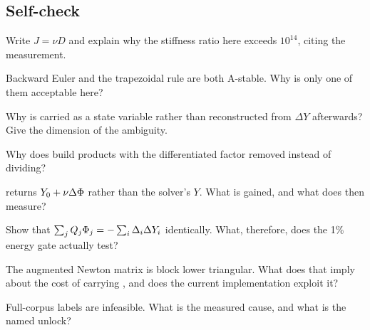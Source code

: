 \subsection{Self-check}
\label{sec:selfcheck-s10}

\begin{selfcheck}
\item Write $J = \nu D$ and explain why the stiffness ratio here exceeds
  $10^{14}$, citing the measurement.
\item Backward Euler and the trapezoidal rule are both A-stable. Why is only one
  of them acceptable here?
\item Why is \Phifl{} carried as a state variable rather than reconstructed from
  $\Delta Y$ afterwards? Give the dimension of the ambiguity.
\item Why does  build products with the differentiated
  factor removed instead of dividing?
\item {} returns $Y_0 + \nu\Delta\Phi$ rather than the
  solver's $Y$. What is gained, and what does  then
  measure?
\item Show that $\sum_j Q_j\Phi_j = -\sum_i \Delta_i \Delta Y_i$ identically.
  What, therefore, does the 1\% energy gate actually test?
\item The augmented Newton matrix is block lower triangular. What does that
  imply about the cost of carrying \Phifl, and does the current implementation
  exploit it?
\item Full-corpus \Phifl{} labels are infeasible. What is the measured cause,
  and what is the named unlock?
\end{selfcheck}
